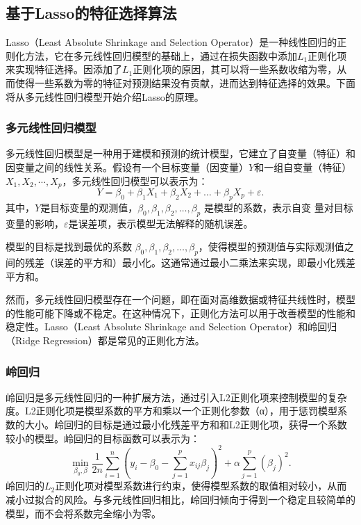 

\subsection{基于Lasso的特征选择算法}

Lasso（Least Absolute Shrinkage and Selection Operator）是一种线性回归的正则化方法，它在多元线性回归模型的基础上，通过在损失函数中添加$L_1$正则化项来实现特征选择。因添加了$L_1$正则化项的原因，其可以将一些系数收缩为零，从而使得一些系数为零的特征对预测结果没有贡献，进而达到特征选择的效果。下面将从多元线性回归模型开始介绍Lasso的原理。

\subsubsection{多元线性回归模型}
多元线性回归模型是一种用于建模和预测的统计模型，它建立了自变量（特征）和因变量之间的线性关系。假设有一个目标变量（因变量）$Y$和一组自变量（特征）$X_1, X_2,\cdots, X_p$，多元线性回归模型可以表示为：
$$Y=\beta_{0}+\beta_{1} X_{1}+\beta_{2} X_{2}+\ldots+\beta_{p} X_{p}+\varepsilon.$$
其中，$Y$是目标变量的观测值，$\beta_{0}, \beta_{1}, \beta_{2}, \ldots, \beta_{p}$  是模型的系数，表示自变 量对目标变量的影响，$\varepsilon$是误差项，表示模型无法解释的随机误差。

模型的目标是找到最优的系数  $\beta_{0}, \beta_{1}, \beta_{2}, \ldots, \beta_{p} $，使得模型的预测值与实际观测值之间的残差（误差的平方和）最小化。这通常通过最小二乘法来实现，即最小化残差平方和。

然而，多元线性回归模型存在一个问题，即在面对高维数据或特征共线性时，模型的性能可能下降或不稳定。在这种情况下，正则化方法可以用于改善模型的性能和稳定性。Lasso（Least Absolute Shrinkage and Selection Operator）和岭回归（Ridge Regression）都是常见的正则化方法\cite{基于Lasso的我国股票价格影响因素分析}。

\subsubsection{岭回归}

岭回归是多元线性回归的一种扩展方法，通过引入L2正则化项来控制模型的复杂度。L2正则化项是模型系数的平方和乘以一个正则化参数（α），用于惩罚模型系数的大小。岭回归的目标是通过最小化残差平方和和L2正则化项，获得一个系数较小的模型。岭回归的目标函数可以表示为：
$$\min _{\beta_{0}, \beta} \frac{1}{2 n} \sum_{i=1}^{n}\left(y_{i}-\beta_{0}-\sum_{j=1}^{p} x_{i j} \beta_{j}\right)^{2}+\alpha \sum_{j=1}^{p}(\beta_{j})^2.$$
岭回归的$L_2$正则化项对模型系数进行约束，使得模型系数的取值相对较小，从而减小过拟合的风险。与多元线性回归相比，岭回归倾向于得到一个稳定且较简单的模型，而不会将系数完全缩小为零\cite{基于Lasso的我国股票价格影响因素分析}。

